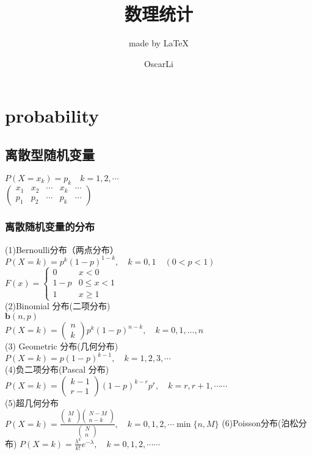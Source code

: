 \documentclass[cn,11pt,chinese,black]{elegantbook}
\title{数理统计}
\subtitle{made by \LaTeX{} }
\author{OscarLi}
\institute{西南交大数学学院}
\begin{document}
	\maketitle
\chapter{probability}
\section{离散型随机变量}
$P\left(X=x_{k}\right)=p_{k} \quad k=1,2, \cdots$\\
$\left(\begin{array}{lllll}{x_{1}} & {x_{2}} & {\cdots} & {x_{k}} & {\cdots} \\ {p_{1}} & {p_{2}} & {\cdots} & {p_{k}} & {\cdots}\end{array}\right)$
\subsection{离散随机变量的分布}
(1)Bernoulli分布（两点分布）\\
$P(X=k)=p^{k}(1-p)^{1-k}, \quad k=0,1 \quad(0<p<1)$\\
$F(x)=\left\{\begin{array}{cc}{0} & {x<0} \\ {1-p} & {0 \leq x<1} \\ {1} & {x \geq 1}\end{array}\right.$\\
(2)Binomial 分布(二项分布)\\
$\boldsymbol{b}(n, p)$\\
$P(X=k)=\left(\begin{array}{l}{n} \\ {k}\end{array}\right) p^{k}(1-p)^{n-k}, \quad k=0,1, \ldots, n$\\
(3) Geometric 分布(几何分布)\\
$P(X=k)=p(1-p)^{k-1}, \quad k=1,2,3, \cdots$\\
(4)负二项分布(Pascal 分布)\\
$P(X=k)=\left(\begin{array}{c}{k-1} \\ {r-1}\end{array}\right)(1-p)^{k-r} p^{r}, \quad k=r, r+1, \cdots \cdots$\\
(5)超几何分布\\
$P(X=k)=\frac{\left(\begin{array}{c}{M} \\ {k}\end{array}\right)\left(\begin{array}{c}{N-M} \\ {n-k}\end{array}\right)}{\left(\begin{array}{c}{N} \\ {n}\end{array}\right)}, \quad k=0,1,2, \cdots \min \{n, M\}$
(6)Poisson分布(泊松分布)
$P(X=k)=\frac{\lambda^{k}}{k !} e^{-\lambda}, \quad k=0,1,2, \cdots \cdots$
\end{document}

